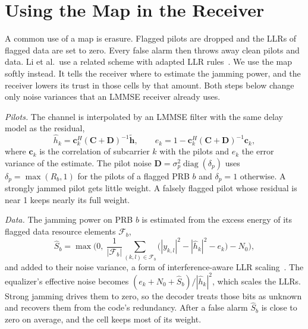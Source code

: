 \documentclass[conference]{IEEEtran}
\begin{document}
\section{Using the Map in the Receiver}
\label{sec:receiver}

A common use of a map is erasure. Flagged pilots are dropped and the LLRs of flagged data are set
to zero. Every false alarm then throws away clean pilots and data. Li et al.\ use a related scheme
with adapted LLR rules~\cite{li2012robust}. We use the map softly instead. It tells the receiver
where to estimate the jamming power, and the receiver lowers its trust in those cells by that
amount. Both steps below change only noise variances that an LMMSE receiver already uses.

\emph{Pilots.} The channel is interpolated by an LMMSE filter with the same delay model as the
residual,
\begin{equation}
  \hat{h}_k = \mathbf{c}_k^H (\mathbf{C} + \mathbf{D})^{-1} \tilde{\mathbf{h}},
  \qquad e_k = 1 - \mathbf{c}_k^H (\mathbf{C} + \mathbf{D})^{-1} \mathbf{c}_k,
  \label{eq:lmmse}
\end{equation}
where $\mathbf{c}_k$ is the correlation of subcarrier $k$ with the pilots and $e_k$ the error
variance of the estimate. The pilot noise $\mathbf{D} = \sigma_p^2 \operatorname{diag}(\delta_p)$
uses $\delta_p = \max(R_{b}, 1)$ for the pilots of a flagged PRB $b$ and $\delta_p = 1$ otherwise.
A strongly jammed pilot gets little weight. A falsely flagged pilot whose residual is near 1 keeps
nearly its full weight.

\emph{Data.} The jamming power on PRB $b$ is estimated from the excess energy of its flagged data
resource elements $\mathcal{F}_b$,
\begin{equation}
  \hat{S}_b = \max\Big(0,\ \frac{1}{|\mathcal{F}_b|} \sum_{(k,l) \in \mathcal{F}_b}
  \big(|y_{k,l}|^2 - |\hat{h}_k|^2 - e_k\big) - N_0 \Big),
  \label{eq:jampower}
\end{equation}
and added to their noise variance, a form of interference-aware LLR scaling~\cite{kumar2019sdr}.
The equalizer's effective noise becomes $(e_k + N_0 + \hat{S}_b)/|\hat{h}_k|^2$, which scales the
LLRs. Strong jamming drives them to zero, so the decoder treats those bits as unknown and recovers
them from the code's redundancy. After a false alarm $\hat{S}_b$ is close to zero on average, and
the cell keeps most of its weight.
\end{document}
